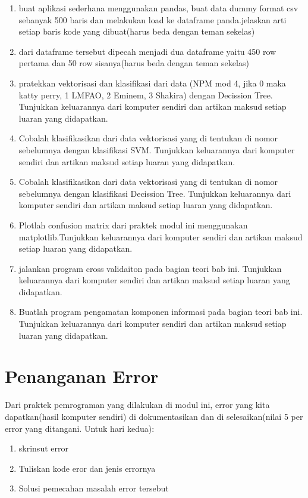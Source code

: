 \begin{enumerate}
\item buat aplikasi sederhana menggunakan pandas, buat data dummy format csv sebanyak 500 baris dan melakukan load ke dataframe panda.jelaskan arti setiap baris kode yang dibuat(harus beda dengan teman sekelas)
\item dari dataframe tersebut dipecah menjadi dua dataframe yaitu 450 row pertama dan 50 row sisanya(harus beda dengan teman sekelas)
\item pratekkan vektorisasi dan klasifikasi dari data (NPM mod 4, jika 0 maka katty perry, 1 LMFAO, 2 Eminem, 3 Shakira) dengan Decission Tree. Tunjukkan keluarannya dari komputer sendiri dan artikan maksud setiap luaran yang didapatkan.
\item Cobalah klasifikasikan dari data vektorisasi yang di tentukan di nomor sebelumnya dengan klasifikasi SVM. Tunjukkan keluarannya dari komputer sendiri dan artikan maksud setiap luaran yang didapatkan.
\item Cobalah klasifikasikan dari data vektorisasi yang di tentukan di nomor sebelumnya dengan klasifikasi Decission Tree. Tunjukkan keluarannya dari komputer sendiri dan artikan maksud setiap luaran yang didapatkan.
\item Plotlah confusion matrix dari praktek modul ini menggunakan matplotlib.Tunjukkan keluarannya dari komputer sendiri dan artikan maksud setiap luaran yang didapatkan.
\item jalankan program cross validaiton pada bagian teori bab ini. Tunjukkan keluarannya dari komputer sendiri dan artikan maksud setiap luaran yang didapatkan.
\item Buatlah program pengamatan komponen informasi pada bagian teori bab ini. Tunjukkan keluarannya dari komputer sendiri dan artikan maksud setiap luaran yang didapatkan.
\end{enumerate}


\section{Penanganan Error}
Dari praktek pemrograman yang dilakukan di modul ini, error yang kita dapatkan(hasil komputer sendiri) di dokumentasikan dan di selesaikan(nilai 5 per error yang ditangani. Untuk hari kedua):

\begin{enumerate}
	\item skrinsut error
	\item Tuliskan kode eror dan jenis errornya
	\item Solusi pemecahan masalah error tersebut
\end{enumerate}

